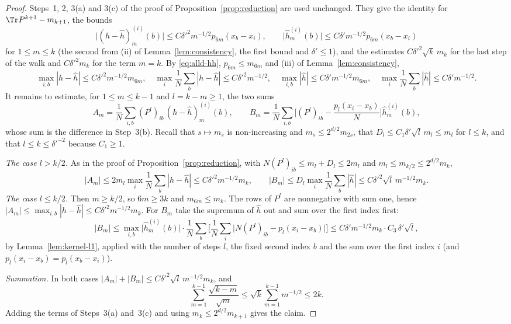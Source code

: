 \begin{proof}
Steps~1, 2, 3(a) and 3(c) of the proof of Proposition~\ref{prop:reduction} are used unchanged. They give
the identity for $\Tr P^{k+1}-m_{k+1}$, the bounds
\begin{equation}\label{eq:alld-hh}
 \big|(h-\hat h)^{(i)}_m(b)\big|\le C\delta'^2m^{-1/2}p_{6m}(x_b-x_i),\qquad
 \big|\hat h^{(i)}_m(b)\big|\le C\delta'm^{-1/2}p_{6m}(x_b-x_i)
\end{equation}
for $1\le m\le k$ (the second from (ii) of Lemma~\ref{lem:consistency}, the first bound and $\delta'\le1$),
and the estimates $C\delta'^2\sqrt k\,m_k$ for the last step of the walk and $C\delta'^2m_k$ for the term
$m=k$. By \eqref{eq:alld-hh}, $p_{6m}\le m_{6m}$ and (iii) of Lemma~\ref{lem:consistency},
\begin{equation}\label{eq:alld-norms}
 \max_{i,b}|h-\hat h|\le C\delta'^2m^{-1/2}m_{6m},\quad\max_i\frac1N\sum_b|h-\hat h|\le C\delta'^2m^{-1/2},\quad
 \max_{i,b}|\hat h|\le C\delta'm^{-1/2}m_{6m},\quad\max_i\frac1N\sum_b|\hat h|\le C\delta'm^{-1/2}.
\end{equation}
It remains to estimate, for $1\le m\le k-1$ and $l=k-m\ge1$, the two sums
\[
 A_m=\frac1N\sum_{i,b}(P^l)_{ib}\,(h-\hat h)^{(i)}_m(b),\qquad
 B_m=\frac1N\sum_{i,b}\Big[(P^l)_{ib}-\frac{p_l(x_i-x_b)}N\Big]\hat h^{(i)}_m(b),
\]
whose sum is the difference in Step~3(b). Recall that $s\mapsto m_s$ is non-increasing and
$m_s\le2^{d/2}m_{2s}$, that $D_l\le C_1\delta'\sqrt l\,m_l\le m_l$ for $l\le k$, and that $l\le k\le\delta'^{-2}$
because $C_1\ge1$.

\emph{The case $l>k/2$.} As in the proof of Proposition~\ref{prop:reduction}, with
$N(P^l)_{ib}\le m_l+D_l\le2m_l$ and $m_l\le m_{k/2}\le2^{d/2}m_k$,
\[
 |A_m|\le2m_l\max_i\frac1N\sum_b|h-\hat h|\le C\delta'^2m^{-1/2}m_k,\qquad
 |B_m|\le D_l\max_i\frac1N\sum_b|\hat h|\le C\delta'^2\sqrt l\,m^{-1/2}m_k .
\]
\emph{The case $l\le k/2$.} Then $m\ge k/2$, so $6m\ge3k$ and $m_{6m}\le m_k$. The rows of $P^l$ are
nonnegative with sum one, hence $|A_m|\le\max_{i,b}|h-\hat h|\le C\delta'^2m^{-1/2}m_k$. For $B_m$ take the
supremum of $\hat h$ out and sum over the first index first:
\[
 |B_m|\le\max_{i,b}\big|\hat h^{(i)}_m(b)\big|\cdot\frac1N\sum_b\Big[\frac1N\sum_i\big|N(P^l)_{ib}-p_l(x_i-x_b)\big|\Big]
 \le C\delta'm^{-1/2}m_k\cdot C_3\,\delta'\sqrt l ,
\]
by Lemma~\ref{lem:kernel-l1}, applied with the number of steps $l$, the fixed second index $b$ and the
sum over the first index $i$ (and $p_l(x_i-x_b)=p_l(x_b-x_i)$).

\emph{Summation.} In both cases $|A_m|+|B_m|\le C\delta'^2\sqrt l\,m^{-1/2}m_k$, and
\[
 \sum_{m=1}^{k-1}\frac{\sqrt{k-m}}{\sqrt m}\le\sqrt k\sum_{m=1}^{k-1}m^{-1/2}\le2k .
\]
Adding the terms of Steps~3(a) and~3(c) and using $m_k\le2^{d/2}m_{k+1}$ gives the claim.
\end{proof}

